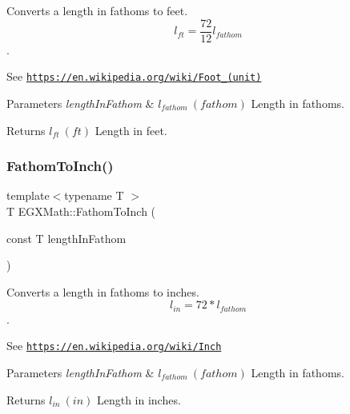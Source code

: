 Converts a length in fathoms to feet. \[ l_{ft}= \frac{72}{12} l_{fathom} \]. 

See \href{https://en.wikipedia.org/wiki/Foot_(unit)}{\tt https\+://en.\+wikipedia.\+org/wiki/\+Foot\+\_\+(unit)} 
\begin{DoxyParams}{Parameters}
{\em length\+In\+Fathom} & $ l_{fathom}\ (fathom)$ Length in fathoms. \\
\hline
\end{DoxyParams}
\begin{DoxyReturn}{Returns}
$ l_{ft}\ (ft)$ Length in feet. 
\end{DoxyReturn}
\mbox{\label{group___e_g_x_math-_conversions-_length_conversions-_nautical-_fathom-_imperial_ga92c156dbffb555541217b319e8cafb72}} 
\subsubsection{\texorpdfstring{Fathom\+To\+Inch()}{FathomToInch()}}
{\footnotesize\ttfamily template$<$typename T $>$ \\
T E\+G\+X\+Math\+::\+Fathom\+To\+Inch (\begin{DoxyParamCaption}\item[{const T}]{length\+In\+Fathom }\end{DoxyParamCaption})}



Converts a length in fathoms to inches. \[ l_{in}=72 * l_{fathom} \]. 

See \href{https://en.wikipedia.org/wiki/Inch}{\tt https\+://en.\+wikipedia.\+org/wiki/\+Inch} 
\begin{DoxyParams}{Parameters}
{\em length\+In\+Fathom} & $ l_{fathom}\ (fathom)$ Length in fathoms. \\
\hline
\end{DoxyParams}
\begin{DoxyReturn}{Returns}
$ l_{in}\ (in)$ Length in inches. 
\end{DoxyReturn}
\mbox{\label{group___e_g_x_math-_conversions-_length_conversions-_nautical-_fathom-_imperial_ga1bdfdd0f208b878241772cc584fa4d1d}} 
